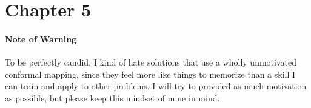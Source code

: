 \section{Chapter 5}

\paragraph{Note of Warning}
To be perfectly candid, I kind of hate solutions that use a wholly unmotivated conformal mapping,
since they feel more like things to memorize than a skill I can train and apply to other problems.
I will try to provided as much motivation as possible, but please keep this mindset of mine in mind.

\begin{enumerate}[wide, labelindent=0pt, label=\arabic*.]

    
    
    
    
    
    
    
    
    
    

\end{enumerate}
